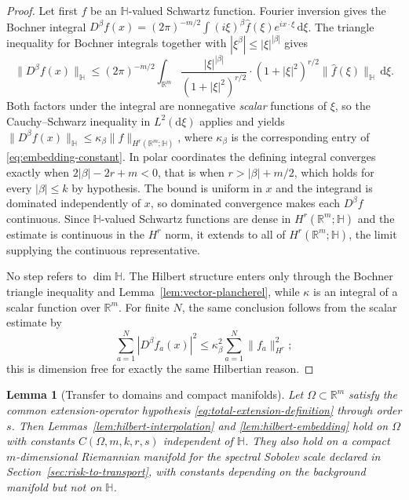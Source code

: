 \documentclass[11pt]{article}
\newtheorem{lemma}[theorem]{Lemma}
\theoremstyle{definition}
\theoremstyle{remark}
\newcommand{\R}{\mathbb{R}}
\newcommand{\dd}{\mathrm{d}}
\begin{document}
\begin{proof}
Let first $f$ be an $\mathbb H$-valued Schwartz function. Fourier inversion gives the
Bochner integral
$D^\beta f(x)=(2\pi)^{-m/2}\int(i\xi)^\beta\hat f(\xi)e^{ix\cdot\xi}\,\dd\xi$.
The triangle inequality for Bochner integrals together with
$|\xi^\beta|\le|\xi|^{|\beta|}$ gives
\begin{equation}
    \|D^\beta f(x)\|_{\mathbb H}
    \le(2\pi)^{-m/2}\!\!\int_{\R^m}\!
      \frac{|\xi|^{|\beta|}}{(1+|\xi|^2)^{r/2}}\cdot
      (1+|\xi|^2)^{r/2}\|\hat f(\xi)\|_{\mathbb H}\,\dd\xi .
\end{equation}
Both factors under the integral are nonnegative \emph{scalar} functions of
$\xi$, so the Cauchy--Schwarz inequality in $L^2(\dd\xi)$ applies and yields
$\|D^\beta f(x)\|_{\mathbb H}\le\kappa_\beta\|f\|_{H^r(\R^m;\mathbb H)}$, where $\kappa_\beta$ is
the corresponding entry of \eqref{eq:embedding-constant}. In polar coordinates
the defining integral converges exactly when $2|\beta|-2r+m<0$, that is when
$r>|\beta|+m/2$, which holds for every $|\beta|\le k$ by hypothesis. The bound
is uniform in $x$ and the integrand is dominated independently of $x$, so
dominated convergence makes each $D^\beta f$ continuous. Since $\mathbb H$-valued
Schwartz functions are dense in $H^r(\R^m;\mathbb H)$ and the estimate is continuous in
the $H^r$ norm, it extends to all of $H^r(\R^m;\mathbb H)$, the limit supplying the
continuous representative.

No step refers to $\dim\mathbb H$. The Hilbert structure enters only through the
Bochner triangle inequality and Lemma~\ref{lem:vector-plancherel}, while
$\kappa$ is an integral of a scalar function over $\R^m$. For finite $N$, the
same conclusion follows from the scalar estimate by
\[
  \sum_{a=1}^N|D^\beta f_a(x)|^2
  \le \kappa_\beta^2\sum_{a=1}^N\|f_a\|_{H^r}^2;
\]
this is dimension free for exactly the same Hilbertian reason.
\end{proof}

\begin{lemma}[Transfer to domains and compact manifolds]\label{lem:hilbert-domain}
Let $\Omega\subset\R^m$ satisfy the common extension-operator hypothesis
\eqref{eq:total-extension-definition} through order $s$. Then
Lemmas~\ref{lem:hilbert-interpolation} and \ref{lem:hilbert-embedding} hold on
$\Omega$ with constants $C(\Omega,m,k,r,s)$ independent of $\mathbb H$.
They also hold on a compact $m$-dimensional Riemannian manifold for the spectral
Sobolev scale declared in Section~\ref{sec:risk-to-transport}, with constants
depending on the background manifold but not on $\mathbb H$.
\end{lemma}
\end{document}
